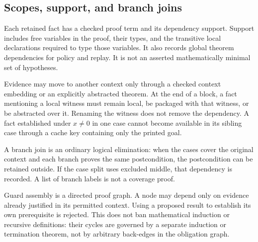 \documentclass[11pt,a4paper]{article}
\theoremstyle{plain}\newtheorem{proposition}{Proposition}[section]
\theoremstyle{definition}\newtheorem{definition}[proposition]{Definition}
\theoremstyle{remark}\newtheorem{remark}[proposition]{Remark}
\begin{document}
\subsection{Scopes, support, and branch joins}\label{sec:support}
Each retained fact has a checked proof term and its dependency support. Support includes free variables in the proof, their types, and the transitive local declarations required to type those variables. It also records global theorem dependencies for policy and replay. It is not an asserted mathematically minimal set of hypotheses.

Evidence may move to another context only through a checked context embedding or an explicitly abstracted theorem. At the end of a block, a fact mentioning a local witness must remain local, be packaged with that witness, or be abstracted over it. Renaming the witness does not remove the dependency. A fact established under \(x\ne0\) in one case cannot become available in its sibling case through a cache key containing only the printed goal.

A branch join is an ordinary logical elimination: when the cases cover the original context and each branch proves the same postcondition, the postcondition can be retained outside. If the case split uses excluded middle, that dependency is recorded. A list of branch labels is not a coverage proof.

Guard assembly is a directed proof graph. A node may depend only on evidence already justified in its permitted context. Using a proposed result to establish its own prerequisite is rejected. This does not ban mathematical induction or recursive definitions: their cycles are governed by a separate induction or termination theorem, not by arbitrary back-edges in the obligation graph.
\end{document}
